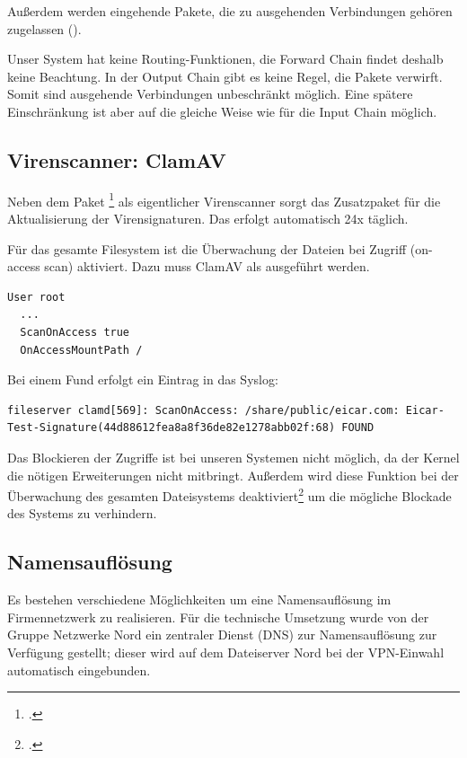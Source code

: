 Außerdem werden eingehende Pakete, die zu ausgehenden Verbindungen gehören zugelassen ().

Unser System hat keine Routing-Funktionen, die Forward Chain findet deshalb keine Beachtung. In der Output Chain gibt es keine Regel, die Pakete verwirft. Somit sind ausgehende Verbindungen unbeschränkt möglich. Eine spätere Einschränkung ist aber auf die gleiche Weise wie für die Input Chain möglich.

\subsection{Virenscanner: ClamAV}
Neben dem Paket \footcite{clamav} als eigentlicher Virenscanner sorgt das Zusatzpaket  für die Aktualisierung der Virensignaturen. Das erfolgt automatisch 24x täglich.

Für das gesamte Filesystem ist die Überwachung der Dateien bei Zugriff (on-access scan) aktiviert. Dazu muss ClamAV als  ausgeführt werden.

\begin{lstlisting}[label=code:denyany,caption=Konfiguration in clamav.conf]
  User root
  ...
  ScanOnAccess true
  OnAccessMountPath /
\end{lstlisting}

Bei einem Fund erfolgt ein Eintrag in das Syslog:
\begin{lstlisting}[label=code:denyany,caption=Syslog Eintrag bei Virenfund]
  fileserver clamd[569]: ScanOnAccess: /share/public/eicar.com: Eicar-Test-Signature(44d88612fea8a8f36de82e1278abb02f:68) FOUND
\end{lstlisting}

Das Blockieren der Zugriffe ist bei unseren Systemen nicht möglich, da der Kernel die nötigen Erweiterungen nicht mitbringt. Außerdem wird diese Funktion bei der Überwachung des gesamten Dateisystems deaktiviert\footcite{clamAVnoOnAccess} um die mögliche Blockade des Systems zu verhindern.

\subsection{Namensauflösung}
Es bestehen verschiedene Möglichkeiten um eine Namensauflösung im Firmennetzwerk zu realisieren. Für die technische Umsetzung wurde von der Gruppe Netzwerke Nord ein zentraler Dienst (DNS) zur Namensauflösung zur Verfügung gestellt; dieser wird auf dem Dateiserver Nord bei der VPN-Einwahl automatisch eingebunden.

